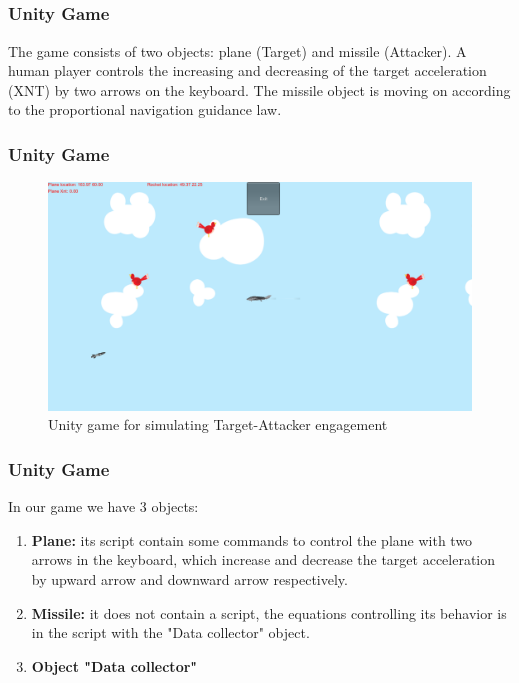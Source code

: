 \documentclass{beamer}
\begin{document}
\subsection{}
\begin{frame}
\frametitle{Unity Game}
The game consists of two objects: plane (Target) and missile (Attacker). A human player controls the increasing and decreasing of the target acceleration (XNT) by two arrows on the keyboard. The missile object is moving on according to the proportional navigation guidance law.
\end{frame}
\begin{frame}
\frametitle{Unity Game}
 \begin{figure}[H]
	\centering
	\includegraphics[scale = 0.2]{fig/unityGame.PNG}
	\caption{Unity game for simulating Target-Attacker engagement}
	\label{UnityGame}
\end{figure}
\end{frame}
\begin{frame}
\frametitle{Unity Game}
In our game we have 3 objects:
\begin{enumerate}
	\item \textbf{Plane:} its script contain some commands to control the plane with two arrows in the keyboard, which increase and decrease the target acceleration by upward arrow and downward arrow respectively. 
	\item \textbf{Missile:} it does not contain a script, the equations controlling its behavior is in the script with the "Data collector" object.
	\item \textbf{Object "Data collector"}
\end{enumerate} 
\end{frame}
\end{document}
